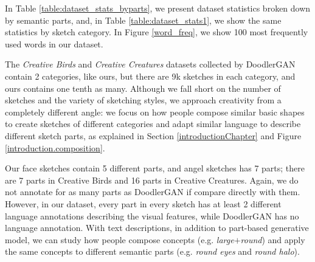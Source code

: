 In Table \ref{table:dataset_stats_byparts}, we present dataset statistics broken down by semantic parts, and, in Table \ref{table:dataset_stats1}, we show the same statistics by sketch category. In Figure \ref{word_freq}, we show 100 most frequently used words in our dataset. 

The \textit{Creative Birds} and \textit{Creative Creatures} datasets collected by DoodlerGAN \citep{doodlerGAN} contain 2 categories, like ours, but there are 9k sketches in each category, and ours contains one tenth as many. Although we fall short on the number of sketches and the variety of sketching styles, we approach creativity from a completely different angle: we focus on how people compose similar basic shapes to create sketches of different categories and adapt similar language to describe different sketch parts, as explained in Section \ref{introductionChapter} and Figure \ref{introduction.composition}.  

Our face sketches contain 5 different parts, and angel sketches has 7 parts; there are 7 parts in Creative Birds and 16 parts in Creative Creatures. Again, we do not annotate for as many parts as DoodlerGAN if compare directly with them. However, in our dataset, every part in every sketch has at least 2 different language annotations describing the visual features, while DoodlerGAN has no language annotation. With text descriptions, in addition to part-based generative model, we can study how people compose concepts (e.g. \textit{large}$+$\textit{round}) and apply the same concepts to different semantic parts (e.g. \textit{round eyes} and \textit{round halo}).     



